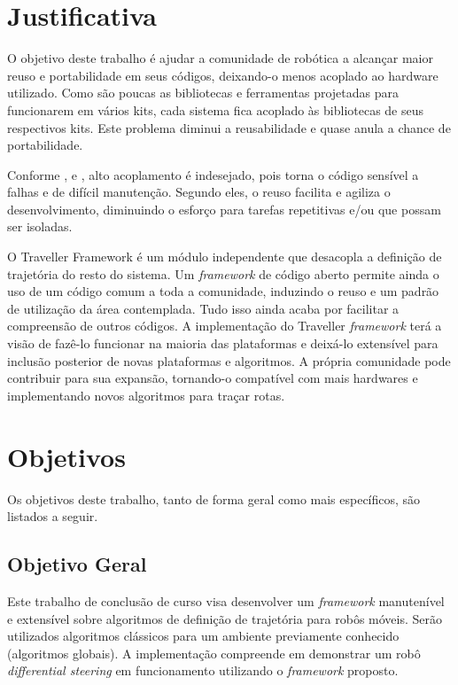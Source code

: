 \section{Justificativa}

O objetivo deste trabalho é ajudar a comunidade de robótica a alcançar maior reuso e portabilidade em seus códigos, deixando-o menos acoplado ao hardware utilizado. Como são poucas as bibliotecas e ferramentas projetadas para funcionarem em vários kits, cada sistema fica acoplado às bibliotecas de seus respectivos kits. Este problema diminui a reusabilidade e quase anula a chance de portabilidade.

Conforme \cite{Larman2005}, \cite{Goodliffe2007} e \cite{McConnel2004}, alto acoplamento é indesejado, pois torna o código sensível a falhas e de difícil manutenção. Segundo eles, o reuso facilita e agiliza o desenvolvimento, diminuindo o esforço para tarefas repetitivas e/ou que possam ser isoladas.

O Traveller Framework é um módulo independente que desacopla a definição de trajetória do resto do sistema. Um \textit{framework} de código aberto permite ainda o uso de um código comum a toda a comunidade, induzindo o reuso e um padrão de utilização da área contemplada. Tudo isso ainda acaba por facilitar a compreensão de outros códigos. A implementação do Traveller \textit{framework} terá a visão de fazê-lo funcionar na maioria das plataformas e deixá-lo extensível para inclusão posterior de novas plataformas e algoritmos. A própria comunidade pode contribuir para sua expansão, tornando-o compatível com mais hardwares e implementando novos algoritmos para traçar rotas.

\section{Objetivos}

Os objetivos deste trabalho, tanto de forma geral como mais específicos, são listados a seguir.

\subsection{Objetivo Geral}

Este trabalho de conclusão de curso visa desenvolver um \textit{framework} manutenível e extensível sobre algoritmos de definição de trajetória para robôs móveis. Serão utilizados algoritmos clássicos para um ambiente previamente conhecido (algoritmos globais). A implementação compreende em demonstrar um robô \textit{differential steering} em funcionamento utilizando o \textit{framework} proposto.

